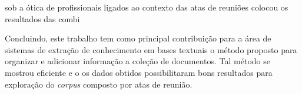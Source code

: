








sob a ótica de profissionais ligados ao contexto das atas de reuniões 
colocou os resultados das combi






Concluindo, este trabalho tem como principal contribuição para a área de sistemas de extração de conhecimento em bases textuais o método proposto para organizar e adicionar informação a coleção de documentos. Tal método se mostrou eficiente e o os dados obtidos possibilitaram bons resultados para exploração do \textit{corpus} composto por atas de reunião.


























































